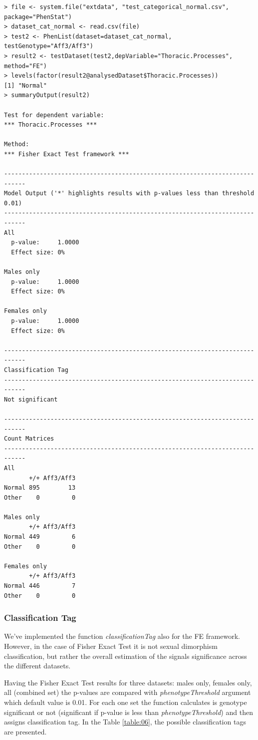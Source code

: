 \documentclass[12pt,a4paper]{article}
\begin{document}
\begingroup
    \fontsize{8pt}{12pt}\selectfont
\begin{verbatim}
> file <- system.file("extdata", "test_categorical_normal.csv", package="PhenStat") 
> dataset_cat_normal <- read.csv(file)
> test2 <- PhenList(dataset=dataset_cat_normal, testGenotype="Aff3/Aff3")
> result2 <- testDataset(test2,depVariable="Thoracic.Processes", method="FE")
> levels(factor(result2@analysedDataset$Thoracic.Processes))
[1] "Normal"
> summaryOutput(result2)

Test for dependent variable:
*** Thoracic.Processes ***

Method:
*** Fisher Exact Test framework ***

----------------------------------------------------------------------------
Model Output ('*' highlights results with p-values less than threshold 0.01)
----------------------------------------------------------------------------
All                
  p-value:     1.0000
  Effect size: 0%    

Males only         
  p-value:     1.0000
  Effect size: 0%    

Females only    
  p-value:     1.0000
  Effect size: 0%    

----------------------------------------------------------------------------
Classification Tag
----------------------------------------------------------------------------
Not significant

----------------------------------------------------------------------------
Count Matrices
----------------------------------------------------------------------------
All
       +/+ Aff3/Aff3
Normal 895        13
Other    0         0

Males only
       +/+ Aff3/Aff3
Normal 449         6
Other    0         0

Females only
       +/+ Aff3/Aff3
Normal 446         7
Other    0         0
\end{verbatim}
\endgroup
\subsubsection{Classification Tag}
We've implemented the function \textit{classificationTag} also for the FE framework. 
However, in the case of Fisher Exact Test it is not sexual dimorphism classification, but rather the overall estimation of the signals significance across the different datasets.

Having the Fisher Exact Test results for three datasets: males only, females only, all (combined set) the p-values are compared with \textit{phenotypeThreshold} argument which default value is 0.01. For each one set the function calculates is genotype significant or not (significant if p-value is less than \textit{phenotypeThreshold}) and then assigns classification tag. In the Table \ref{table:06}, the possible classification tags are presented.  
\end{document}

